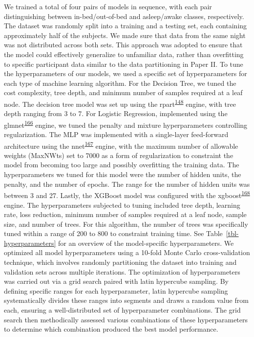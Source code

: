 \documentclass[
  10pt,
]{scrbook}
\begin{document}
We trained a total of four pairs of models in sequence, with each pair
distinguishing between in-bed/out-of-bed and asleep/awake classes,
respectively. The dataset was randomly split into a training and a
testing set, each containing approximately half of the subjects. We made
sure that data from the same night was not distributed across both sets.
This approach was adopted to ensure that the model could effectively
generalize to unfamiliar data, rather than overfitting to specific
participant data similar to the data partitioning in Paper II. To tune
the hyperparameters of our models, we used a specific set of
hyperparameters for each type of machine learning algorithm. For the
Decision Tree, we tuned the cost complexity, tree depth, and minimum
number of samples required at a leaf node. The decision tree model was
set up using the
rpart\textsuperscript{\protect\hyperlink{ref-rpart}{148}} engine, with
tree depth ranging from 3 to 7. For Logistic Regression, implemented
using the
glmnet\textsuperscript{\protect\hyperlink{ref-friedman_glmnet_2010}{166}}
engine, we tuned the penalty and mixture hyperparameters controlling
regularization. The MLP was implemented with a single-layer feed-forward
architecture using the
nnet\textsuperscript{\protect\hyperlink{ref-nnet}{167}} engine, with the
maximum number of allowable weights (MaxNWts) set to 7000 as a form of
regularization to constraint the model from becoming too large and
possibly overfitting the training data. The hyperparameters we tuned for
this model were the number of hidden units, the penalty, and the number
of epochs. The range for the number of hidden units was between 3 and
27. Lastly, the XGBoost model was configured with the
xgboost\textsuperscript{\protect\hyperlink{ref-xgboost}{168}} engine.
The hyperparameters subjected to tuning included tree depth, learning
rate, loss reduction, minimum number of samples required at a leaf node,
sample size, and number of trees. For this algorithm, the number of
trees was specifically tuned within a range of 200 to 800 to constraint
training time. See Table~\ref{tbl-hyperparameters} for an overview of
the model-specific hyperparameters. We optimized all model
hyperparameters using a 10-fold Monte Carlo cross-validation technique,
which involves randomly partitioning the dataset into training and
validation sets across multiple iterations. The optimization of
hyperparameters was carried out via a grid search paired with latin
hypercube sampling. By defining specific ranges for each hyperparameter,
latin hypercube sampling systematically divides these ranges into
segments and draws a random value from each, ensuring a well-distributed
set of hyperparameter combinations. The grid search then methodically
assessed various combinations of these hyperparameters to determine
which combination produced the best model performance.
\end{document}
